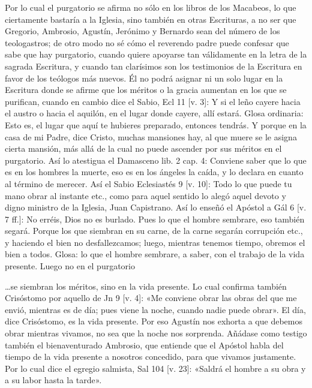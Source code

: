 \marginpar{\small[327]} Por lo cual el purgatorio se afirma no sólo en los libros de los Macabeos, lo que ciertamente bastaría a la Iglesia, sino también en otras Escrituras, a no ser que Gregorio, Ambrosio, Agustín, Jerónimo y Bernardo sean del número de los teologastros; de otro modo no sé cómo el reverendo padre puede confesar que sabe que hay purgatorio, cuando quiere apoyarse tan válidamente en la letra de la sagrada Escritura, y cuando tan clarísimos son los testimonios de la Escritura en favor de los teólogos más nuevos. Él no podrá asignar ni un solo lugar en la Escritura donde se afirme que los méritos o la gracia aumentan en los que se purifican, cuando en cambio dice el Sabio, Ecl 11 [v. 3]: Y si el leño cayere hacia el austro o hacia el aquilón, en el lugar donde cayere, allí estará. Glosa ordinaria: Esto es, el lugar que aquí te hubieres preparado, entonces tendrás. Y porque en la casa de mi Padre, dice Cristo, muchas mansiones hay, al que muere se le asigna cierta mansión, más allá de la cual no puede ascender por sus méritos en el purgatorio. Así lo atestigua el Damasceno lib. 2 cap. 4: Conviene saber que lo que es en los hombres la muerte, eso es en los ángeles la caída, y lo declara en cuanto al término de merecer. Así el Sabio Eclesiastés 9 [v. 10]: Todo lo que puede tu mano obrar al instante etc., como para aquel sentido lo alegó aquel devoto y digno ministro de la Iglesia, Juan Capistrano. Así lo enseñó el Apóstol a Gál 6 [v. 7 ff.]: No erréis, Dios no es burlado. Pues lo que el hombre sembrare, eso también segará. Porque los que siembran en su carne, de la carne segarán corrupción etc., y haciendo el bien no desfallezcamos; luego, mientras tenemos tiempo, obremos el bien a todos. Glosa: lo que el hombre sembrare, a saber, con el trabajo de la vida presente. Luego no en el purgatorio

…se siembran los méritos, sino en la vida presente. Lo cual confirma también Crisóstomo por aquello de Jn 9 [v. 4]: «Me conviene obrar las obras del que me envió, mientras es de día; pues viene la noche, cuando nadie puede obrar». El día, dice Crisóstomo, es la vida presente. Por eso Agustín nos exhorta a que debemos obrar mientras vivamos, no sea que la noche nos sorprenda. Añádase como testigo también el bienaventurado Ambrosio, que entiende que el Apóstol habla del tiempo de la vida presente a nosotros concedido, para que vivamos justamente. Por lo cual dice el egregio salmista, Sal 104 [v. 23]: «Saldrá el hombre a su obra y a su labor hasta la tarde».


